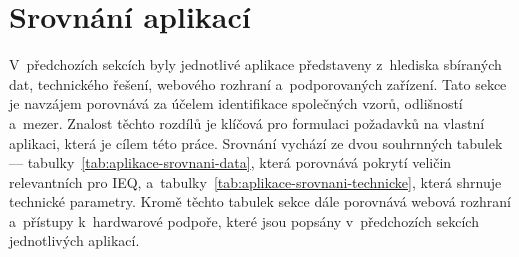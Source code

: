 \FloatBarrier
\section{Srovnání aplikací}
\label{sec:srovnani-aplikaci}

V~předchozích sekcích byly jednotlivé aplikace představeny z~hlediska sbíraných dat, technického řešení, webového rozhraní a~podporovaných zařízení. Tato sekce je navzájem porovnává za účelem identifikace společných vzorů, odlišností a~mezer. Znalost těchto rozdílů je klíčová pro formulaci požadavků na vlastní aplikaci, která je cílem této práce. Srovnání vychází ze dvou souhrnných tabulek --- tabulky~\ref{tab:aplikace-srovnani-data}, která porovnává pokrytí veličin relevantních pro IEQ, a~tabulky~\ref{tab:aplikace-srovnani-technicke}, která shrnuje technické parametry. Kromě těchto tabulek sekce dále porovnává webová rozhraní a~přístupy k~hardwarové podpoře, které jsou popsány v~předchozích sekcích jednotlivých aplikací.

